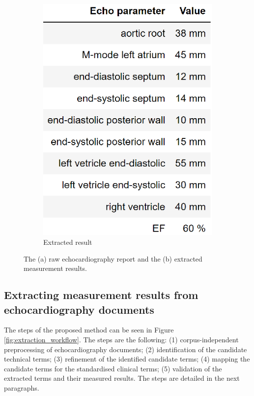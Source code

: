 \begin{figure}[h]
\begin{subfigure}[b]{0.36\textwidth}
		\includegraphics[width=\textwidth]{assets/figures/text_mining/corpus/extracted_echo_example.eps}
		\caption{Extracted result}
		\label{fig:extraction_example_b}
	\end{subfigure}
	\caption{The (a) raw echocardiography report and the (b) extracted measurement results.}
	\label{fig:extraction_example}
\end{figure}

\subsection{Extracting measurement results from echocardiography documents}
\label{subsec:extracting}


The steps of the proposed method can be seen in Figure \ref{fig:extraction_workflow}. The steps are the following: (1) corpus-independent preprocessing of echocardiography documents; (2) identification of the candidate technical terms; (3) refinement of the identified candidate terms; (4) mapping the candidate terms for the standardised clinical terms; (5) validation of the extracted terms and their measured results. The steps are detailed in the next paragraphs.

